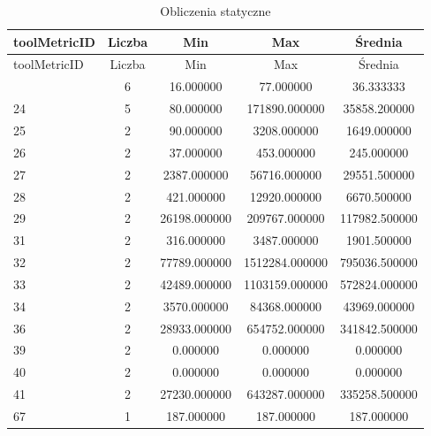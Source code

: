 \documentclass[a4paper,12pt]{article}
\begin{document}
\begin{center}
\small
\begin{longtable}{l S[table-format=3.0] S[table-format=8.2] S[table-format=8.2] S[table-format=8.2]}
\caption{Obliczenia statyczne} \label{tab:tool_metrics_full} \\
\toprule
{toolMetricID} & {Liczba} & {Min} & {Max} & {Średnia} \\
\midrule
\endfirsthead

\toprule
{toolMetricID} & {Liczba} & {Min} & {Max} & {Średnia} \\
\midrule
\endhead

\bottomrule
{}   &   6   &    16.000000   &      77.000000    &      36.333333 \\
          24   &   5   &    80.000000   &   171890.000000    &     35858.200000 \\
          25   &   2   &    90.000000   &    3208.000000    &      1649.000000 \\
          26   &   2   &    37.000000   &     453.000000    &       245.000000 \\
          27   &   2   &  2387.000000   &    56716.000000    &     29551.500000 \\
          28   &   2   &   421.000000   &    12920.000000    &      6670.500000 \\
          29   &   2   & 26198.000000   &   209767.000000    &    117982.500000 \\
          31   &   2   &   316.000000   &    3487.000000    &      1901.500000 \\
          32   &   2   & 77789.000000   &  1512284.000000    &    795036.500000 \\
          33   &   2   & 42489.000000   &  1103159.000000    &    572824.000000 \\
          34   &   2   &  3570.000000   &    84368.000000    &     43969.000000 \\
          36   &   2   & 28933.000000   &   654752.000000    &    341842.500000 \\
          39   &   2   &    0.000000    &      0.000000     &       0.000000 \\
          40   &   2   &    0.000000    &      0.000000     &       0.000000 \\
          41   &   2   & 27230.000000   &   643287.000000    &    335258.500000 \\
          67   &   1   &   187.000000   &    187.000000     &     187.000000 \\

\end{longtable}
\end{center}
\end{document}
